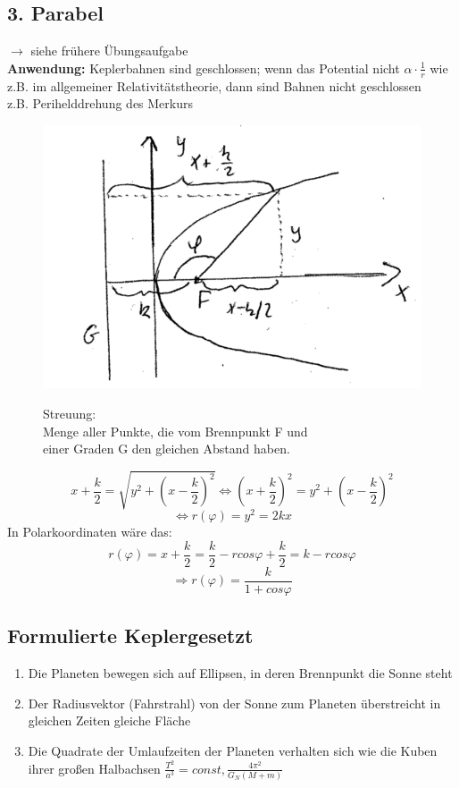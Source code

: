 \documentclass[11pt]{article}
\begin{document}
\subsection{3. Parabel}
$\rightarrow$ siehe frühere Übungsaufgabe\\
\textbf{Anwendung:} Keplerbahnen sind geschlossen; wenn das Potential nicht $\alpha \cdot \frac{1}{r}$ wie z.B. im allgemeiner Relativitätstheorie, dann sind Bahnen nicht geschlossen\\
z.B. Perihelddrehung des Merkurs
		\begin{figure}[htbp]
		\begin{minipage}[t]{10cm}
			\vspace{0pt}
			\centering
			\includegraphics[scale=0.5]{Parabel.png}
		\end{minipage}
		\hfill
		\begin{minipage}[t]{10cm}
			\vspace{0pt}
			Streuung:\\
			Menge aller Punkte, die vom Brennpunkt F und \\einer Graden G den gleichen Abstand haben.
			\end{minipage}
			\end{figure}
		\[ x + \frac{k}{2} = \sqrt{y^2 + (x- \frac{k}{2})^2}   \Leftrightarrow (x + \frac{k}{2})^2 = y^2+(x - \frac{k}{2})^2 \]
		\[ \Leftrightarrow r(\varphi) = y^2 = 2 kx \]
		In Polarkoordinaten wäre das:
		\[ r(\varphi) = x + \frac{k}{2} = \frac{k}{2} - r cos \varphi + \frac{k}{2} = k - r cos \varphi \]
		\[ \Rightarrow r (\varphi) = \frac{k}{1 + cos \varphi} \]
	\subsection{Formulierte Keplergesetzt}
		\begin{enumerate}
			\item Die Planeten bewegen sich auf Ellipsen, in deren Brennpunkt die Sonne steht
			\item Der Radiusvektor (Fahrstrahl) von der Sonne zum Planeten überstreicht in gleichen Zeiten gleiche Fläche
			\item Die Quadrate der Umlaufzeiten der Planeten verhalten sich wie die Kuben ihrer großen Halbachsen $ \frac{T^2}{a^3} = const, \frac{4 \pi^2}{G_N (M + m)} $
		\end{enumerate}
\end{document}
